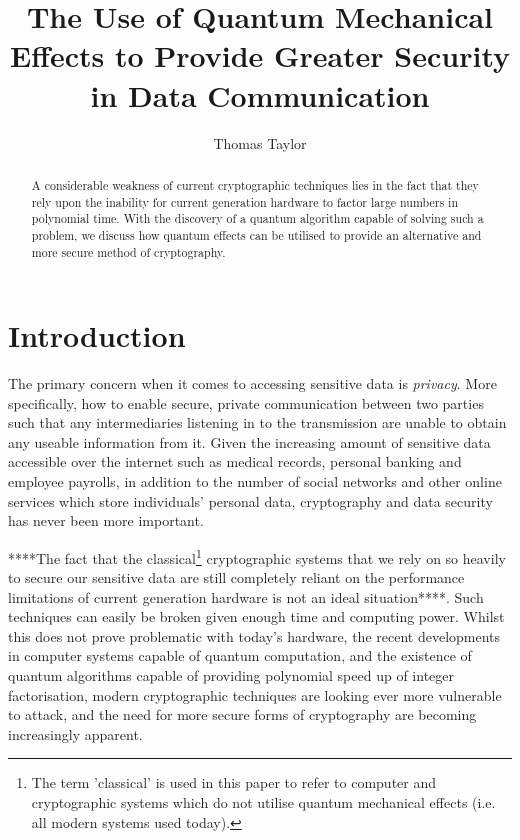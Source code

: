 \documentclass[runningheads,a4paper]{llncs}
\begin{document}
\mainmatter  

\title{The Use of Quantum Mechanical Effects to Provide Greater Security in Data Communication}
\author{Thomas Taylor\\ \mail}

\maketitle

\begin{abstract}
A considerable weakness of current cryptographic techniques lies in the fact that they rely upon the inability for current generation hardware to factor large numbers in polynomial time. With the discovery of a quantum algorithm capable of solving such a problem, we discuss how quantum effects can be utilised to provide an alternative and more secure method of cryptography.

\end{abstract}

\section{Introduction}

The primary concern when it comes to accessing sensitive data is \emph{privacy}. More specifically, how to enable secure, private communication between two parties such that any intermediaries listening in to the transmission are unable to obtain any useable information from it\cite{Rivest:1990fk}. Given the increasing amount of sensitive data accessible over the internet such as medical records, personal banking and employee payrolls, in addition to the number of social networks and other online services which store individuals' personal data, cryptography and data security has never been more important.

****The fact that the classical\footnote[1]{The term 'classical' is used in this paper to refer to computer and cryptographic systems which do not utilise quantum mechanical effects (i.e. all modern systems used today).} cryptographic systems that we rely on so heavily to secure our sensitive data are still completely reliant on the performance limitations of current generation hardware is not an ideal situation****. Such techniques can easily be broken given enough time and computing power. Whilst this does not prove problematic with today's hardware, the recent developments in computer systems capable of quantum computation\cite{Lu:2007uq}, and the existence of quantum algorithms capable of providing polynomial speed up of integer factorisation\cite{Shor:1994fk}, modern cryptographic techniques are looking ever more vulnerable to attack, and the need for more secure forms of cryptography are becoming increasingly apparent.
\end{document}
